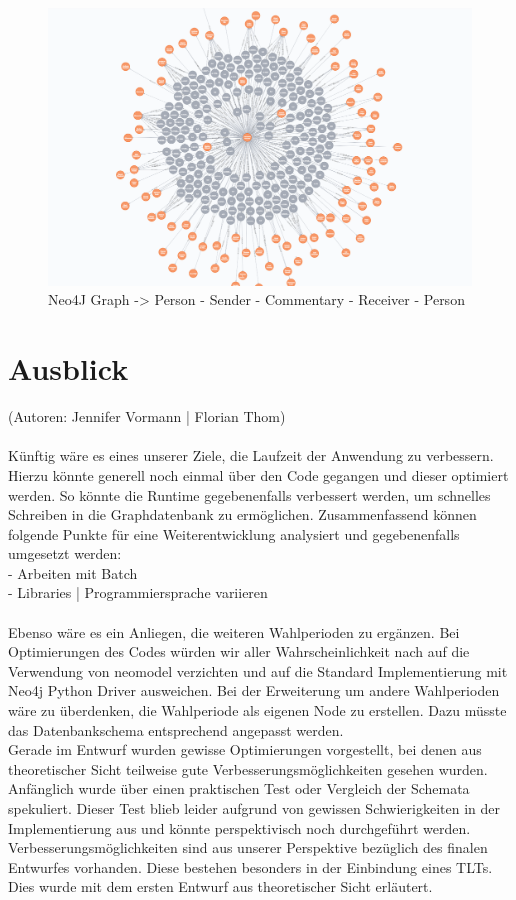 \begin{figure}[htb]
    \centering
    \includegraphics[width=\textwidth]{chapters/05-Interaktion-Abgeord/6.PNG} 
    \caption{Neo4J Graph -> Person - Sender - Commentary - Receiver - Person}
    \label{fig:chapters/05-Interaktion-Abgeord/6.PNG}
\end{figure}
\section{Ausblick}\label{sec:04_05_ausblick}
(Autoren: Jennifer Vormann | Florian Thom)\\
\\
Künftig wäre es eines unserer Ziele, die Laufzeit der Anwendung zu verbessern. Hierzu könnte generell noch einmal über den Code gegangen und dieser optimiert werden. So könnte die Runtime gegebenenfalls verbessert werden, um schnelles Schreiben in die Graphdatenbank zu ermöglichen. 
Zusammenfassend können folgende Punkte für eine Weiterentwicklung analysiert und gegebenenfalls umgesetzt werden:\\
- Arbeiten mit Batch\\
- Libraries | Programmiersprache variieren \\
\\
Ebenso wäre es ein Anliegen, die weiteren Wahlperioden zu ergänzen. Bei Optimierungen des Codes würden wir aller Wahrscheinlichkeit nach auf die Verwendung von neomodel verzichten und auf die Standard Implementierung mit Neo4j Python Driver ausweichen. Bei der Erweiterung um andere Wahlperioden wäre zu überdenken, die Wahlperiode als eigenen Node zu erstellen. Dazu müsste das Datenbankschema entsprechend angepasst werden.\\
Gerade im Entwurf wurden gewisse Optimierungen vorgestellt, bei denen aus theoretischer Sicht teilweise gute Verbesserungsmöglichkeiten gesehen wurden. Anfänglich wurde über einen praktischen Test oder Vergleich der Schemata spekuliert. Dieser Test blieb leider aufgrund von gewissen Schwierigkeiten in der Implementierung aus und könnte perspektivisch noch durchgeführt werden. Verbesserungsmöglichkeiten sind aus unserer Perspektive bezüglich des finalen Entwurfes vorhanden. Diese bestehen besonders in der Einbindung eines TLTs. Dies wurde mit dem ersten Entwurf aus theoretischer Sicht erläutert.
